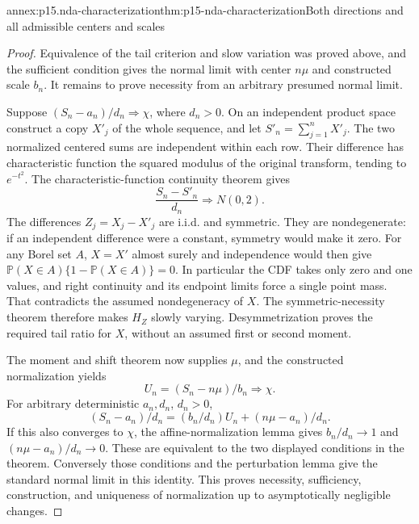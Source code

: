 \begin{annexitem}{annex:p15.nda-characterization}{thm:p15-nda-characterization}{Both directions and all admissible centers and scales}
\begin{proof}
Equivalence of the tail criterion and slow variation was proved
above, and the sufficient condition gives the normal limit with
center \(n\mu\) and constructed scale \(b_n\).
It remains to prove necessity from an arbitrary presumed normal limit.

Suppose \((S_n-a_n)/d_n\Rightarrow\chi\), where \(d_n>0\).
On an independent product space construct a copy \(X'_j\)
of the whole sequence, and let \(S'_n=\sum_{j=1}^nX'_j\).
The two normalized centered sums are independent within each row.
Their difference has characteristic function the squared modulus
of the original transform, tending to \(e^{-t^2}\).
The characteristic-function continuity theorem gives
\[
 \frac{S_n-S'_n}{d_n}\Rightarrow N(0,2).
 \]
The differences \(Z_j=X_j-X'_j\) are i.i.d. and symmetric.
They are nondegenerate: if an independent difference were a
constant, symmetry would make it zero. For any Borel set \(A\),
\(X=X'\) almost surely and independence would then give
\(\mathbb P(X\in A)\{1-\mathbb P(X\in A)\}=0\).
In particular the CDF takes only zero and one values, and
right continuity and its endpoint limits force a single point mass.
That contradicts the assumed nondegeneracy of \(X\).
The symmetric-necessity theorem therefore makes \(H_Z\)
slowly varying. Desymmetrization proves the required tail ratio
for \(X\), without an assumed first or second moment.

The moment and shift theorem now supplies \(\mu\), and the
constructed normalization yields
\[
 U_n=(S_n-n\mu)/b_n\Rightarrow\chi.
 \]
For arbitrary deterministic \(a_n,d_n\), \(d_n>0\),
\[
 (S_n-a_n)/d_n=(b_n/d_n)U_n+(n\mu-a_n)/d_n.
 \]
If this also converges to \(\chi\), the affine-normalization
lemma gives \(b_n/d_n\to1\) and
\((n\mu-a_n)/d_n\to0\).
These are equivalent to the two displayed conditions in the theorem.
Conversely those conditions and the perturbation lemma give
the standard normal limit in this identity.
This proves necessity, sufficiency, construction, and uniqueness
of normalization up to asymptotically negligible changes.
\end{proof}
\end{annexitem}

